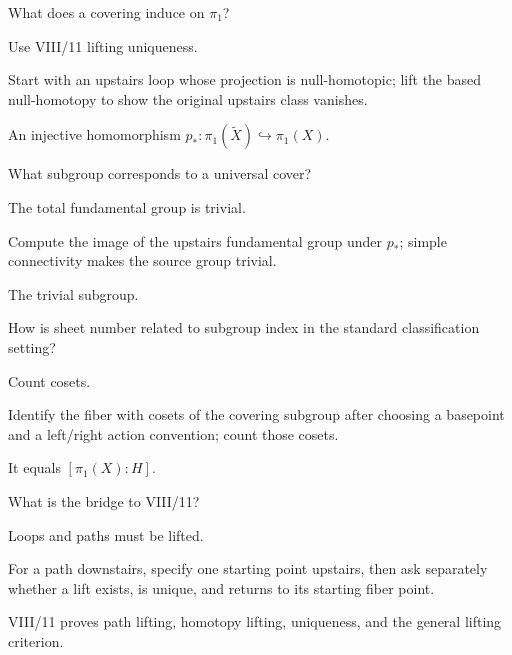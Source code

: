 \begin{exercise}\label{exr:viii10-21}
What does a covering induce on \(\pi_1\)?
\end{exercise}
\begin{hint}
Use VIII/11 lifting uniqueness.

Start with an upstairs loop whose projection is null-homotopic; lift the based null-homotopy to show the original upstairs class vanishes.
\end{hint}
\begin{solution}
An injective homomorphism \(p_*:\pi_1(\widetilde X)\hookrightarrow\pi_1(X)\).
\end{solution}

\begin{exercise}\label{exr:viii10-22}
What subgroup corresponds to a universal cover?
\end{exercise}
\begin{hint}
The total fundamental group is trivial.

Compute the image of the upstairs fundamental group under \(p_*\); simple connectivity makes the source group trivial.
\end{hint}
\begin{solution}
The trivial subgroup.
\end{solution}

\begin{exercise}\label{exr:viii10-23}
How is sheet number related to subgroup index in the standard classification setting?
\end{exercise}
\begin{hint}
Count cosets.

Identify the fiber with cosets of the covering subgroup after choosing a basepoint and a left/right action convention; count those cosets.
\end{hint}
\begin{solution}
It equals \([\pi_1(X):H]\).
\end{solution}

\begin{exercise}\label{exr:viii10-24}
What is the bridge to VIII/11?
\end{exercise}
\begin{hint}
Loops and paths must be lifted.

For a path downstairs, specify one starting point upstairs, then ask separately whether a lift exists, is unique, and returns to its starting fiber point.
\end{hint}
\begin{solution}
VIII/11 proves path lifting, homotopy lifting, uniqueness, and the general lifting criterion.
\end{solution}


